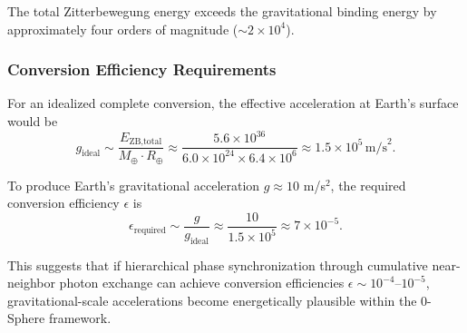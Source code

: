 \documentclass[
 reprint,
 amsmath,amssymb,
 aps,
 prb,
]{revtex4-2}
\numberwithin{equation}{section}
\begin{document}
The total Zitterbewegung energy exceeds the gravitational binding energy by approximately four orders of magnitude ($\sim 2 \times 10^4$).

\subsubsection{Conversion Efficiency Requirements}

For an idealized complete conversion, the effective acceleration at Earth's surface would be
\begin{equation}
g_{\text{ideal}} \sim \frac{E_{\text{ZB,total}}}{M_{\oplus} \cdot R_{\oplus}} \approx \frac{5.6 \times 10^{36}}{6.0 \times 10^{24} \times 6.4 \times 10^6} \approx 1.5 \times 10^5\,\text{m/s}^2.
\end{equation}

To produce Earth's gravitational acceleration $g \approx 10$ m/s$^2$, the required conversion efficiency $\epsilon$ is
\begin{equation}
\epsilon_{\text{required}} \sim \frac{g}{g_{\text{ideal}}} \approx \frac{10}{1.5 \times 10^5} \approx 7 \times 10^{-5}.
\end{equation}

This suggests that if hierarchical phase synchronization through cumulative near-neighbor photon exchange can achieve conversion efficiencies $\epsilon \sim 10^{-4}$--$10^{-5}$, gravitational-scale accelerations become energetically plausible within the 0-Sphere framework.
\end{document}
